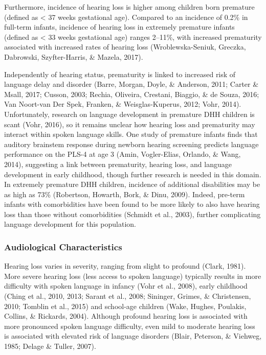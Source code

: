 \documentclass[english,man]{apa6}
\begin{document}
Furthermore, incidence of hearing loss is higher among children born premature (defined as \textless{} 37 weeks gestational age). Compared to an incidence of 0.2\% in full-term infants, incidence of hearing loss in extremely premature infants (defined as \textless{} 33 weeks gestational age) ranges 2--11\%, with increased prematurity associated with increased rates of hearing loss (Wroblewska-Seniuk, Greczka, Dabrowski, Szyfter-Harris, \& Mazela, 2017).

Independently of hearing status, prematurity is linked to increased risk of language delay and disorder (Barre, Morgan, Doyle, \& Anderson, 2011; Carter \& Msall, 2017; Cusson, 2003; Rechia, Oliveira, Crestani, Biaggio, \& de Souza, 2016; Van Noort-van Der Spek, Franken, \& Weisglas-Kuperus, 2012; Vohr, 2014). Unfortunately, research on language development in premature DHH children is scant (Vohr, 2016), so it remains unclear how hearing loss and prematurity may interact within spoken language skills. One study of premature infants finds that auditory brainstem response during newborn hearing screening predicts language performance on the PLS-4 at age 3 (Amin, Vogler-Elias, Orlando, \& Wang, 2014), suggesting a link between prematurity, hearing loss, and language development in early childhood, though further research is needed in this domain. In extremely premature DHH children, incidence of additional disabilities may be as high as 73\% (Robertson, Howarth, Bork, \& Dinu, 2009). Indeed, pre-term infants with comorbidities have been found to be more likely to also have hearing loss than those without comorbidities (Schmidt et al., 2003), further complicating language development for this population.

\hypertarget{audiological-characteristics}{%
\subsubsection{Audiological Characteristics}\label{audiological-characteristics}}

Hearing loss varies in severity, ranging from slight to profound (Clark, 1981). More severe hearing loss (less access to spoken language) typically results in more difficulty with spoken language in infancy (Vohr et al., 2008), early childhood (Ching et al., 2010, 2013; Sarant et al., 2008; Sininger, Grimes, \& Christensen, 2010; Tomblin et al., 2015) and school-age children (Wake, Hughes, Poulakis, Collins, \& Rickards, 2004). Although profound hearing loss is associated with more pronounced spoken language difficulty, even mild to moderate hearing loss is associated with elevated risk of language disorders (Blair, Peterson, \& Viehweg, 1985; Delage \& Tuller, 2007).
\end{document}
